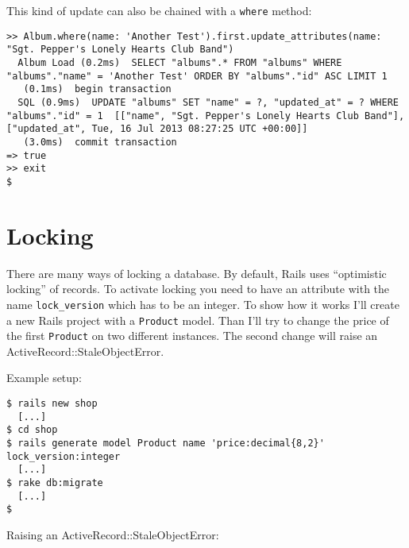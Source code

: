 \documentclass[a4paper]{book}
\newcounter{tab}[chapter]
\begin{document}
This kind of update can also be chained with a \texttt{where} method:

\begin{shaded}\begin{verbatim}
>> Album.where(name: 'Another Test').first.update_attributes(name: "Sgt. Pepper's Lonely Hearts Club Band")
  Album Load (0.2ms)  SELECT "albums".* FROM "albums" WHERE "albums"."name" = 'Another Test' ORDER BY "albums"."id" ASC LIMIT 1
   (0.1ms)  begin transaction
  SQL (0.9ms)  UPDATE "albums" SET "name" = ?, "updated_at" = ? WHERE "albums"."id" = 1  [["name", "Sgt. Pepper's Lonely Hearts Club Band"], ["updated_at", Tue, 16 Jul 2013 08:27:25 UTC +00:00]]
   (3.0ms)  commit transaction
=> true
>> exit
$
\end{verbatim}\end{shaded}

\section{Locking}\label{locking}

There are many ways of locking a database. By default, Rails uses “optimistic locking” of records. To activate locking you need to have an attribute with the name \texttt{lock\_version} which has to be an integer. To show how it works I'll create a new Rails project with a \texttt{Product} model. Than I'll try to change the price of the first \texttt{Product} on two different instances. The second change will raise an ActiveRecord::StaleObjectError.

Example setup:

\begin{shaded}\begin{verbatim}
$ rails new shop
  [...]
$ cd shop
$ rails generate model Product name 'price:decimal{8,2}' lock_version:integer
  [...]
$ rake db:migrate
  [...]
$
\end{verbatim}\end{shaded}

Raising an ActiveRecord::StaleObjectError:
\end{document}
